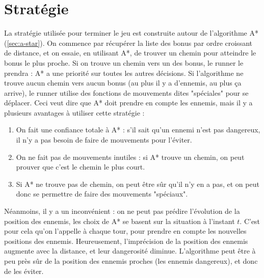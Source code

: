 \chapter{Stratégie}
\label{cp:strategie}

La stratégie utilisée pour terminer le jeu est construite autour de l'algorithme A* (\autoref{sec:a-star}).
\newline
On commence par récupérer la liste des bonus par ordre croissant de distance, et on essaie, en utilisant A*, de trouver un chemin pour atteindre le bonus le plus proche.
\newline
Si on trouve un chemin vers un des bonus, le runner le prendra : A* a une priorité sur toutes les autres décisions.
\newline
Si l'algorithme ne trouve aucun chemin vers aucun bonus (au plus il y a d'ennemis, au plus ça arrive), le runner utilise des fonctions de mouvements dites "spéciales" pour se déplacer.
\newline\newline
Ceci veut dire que A* doit prendre en compte les ennemis, mais il y a plusieurs avantages à utiliser cette stratégie :

\begin{enumerate}
    \item On fait une confiance totale à A* : s'il sait qu'un ennemi n'est pas dangereux, il n'y a pas besoin de faire de mouvements pour l'éviter.
    \item On ne fait pas de mouvements inutiles : si A* trouve un chemin, on peut prouver que c'est le chemin le plus court.
    \item Si A* ne trouve pas de chemin, on peut être sûr qu'il n'y en a pas, et on peut donc se permettre de faire des mouvements "spéciaux".
\end{enumerate}
Néanmoins, il y a un inconvénient : on ne peut pas prédire l'évolution de la position des ennemis, les choix de A* se basent sur la situation à l'instant $t$.
C'est pour cela qu'on l'appelle à chaque tour, pour prendre en compte les nouvelles positions des ennemis.
\newline\newline
Heureusement, l'imprécision de la position des ennemis augmente avec la distance, et leur dangerosité diminue.
L'algorithme peut être à peu près sûr de la position des ennemis proches (les ennemis dangereux), et donc de les éviter.

\newpage

